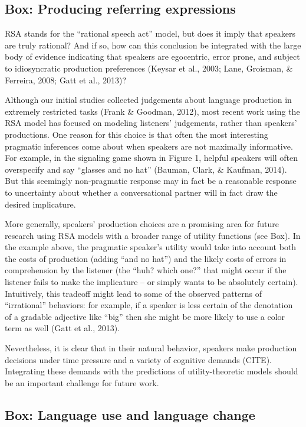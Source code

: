 \documentclass[]{elsarticle}
\begin{document}
\subsection{Box: Producing referring expressions
}\label{box-producing-referring-expressions}

RSA stands for the ``rational speech act'' model, but does it imply that
speakers are truly rational? And if so, how can this conclusion be
integrated with the large body of evidence indicating that speakers are
egocentric, error prone, and subject to idiosyncratic production
preferences (Keysar et al., 2003; Lane, Groisman, \& Ferreira, 2008;
Gatt et al., 2013)?

Although our initial studies collected judgements about language
production in extremely restricted tasks (Frank \& Goodman, 2012), most
recent work using the RSA model has focused on modeling listeners'
judgements, rather than speakers' productions. One reason for this
choice is that often the most interesting pragmatic inferences come
about when speakers are not maximally informative. For example, in the
signaling game shown in Figure 1, helpful speakers will often
overspecify and say ``glasses and no hat'' (Bauman, Clark, \& Kaufman,
2014). But this seemingly non-pragmatic response may in fact be a
reasonable response to uncertainty about whether a conversational
partner will in fact draw the desired implicature.

More generally, speakers' production choices are a promising area for
future research using RSA models with a broader range of utility
functions (see Box). In the example above, the pragmatic speaker's
utility would take into account both the costs of production (adding
``and no hat'') and the likely costs of errors in comprehension by the
listener (the ``huh? which one?'' that might occur if the listener fails
to make the implicature -- or simply wants to be absolutely certain).
Intuitively, this tradeoff might lead to some of the observed patterns
of ``irrational'' behaviors: for example, if a speaker is less certain
of the denotation of a gradable adjective like ``big'' then she might be
more likely to use a color term as well (Gatt et al., 2013).

Nevertheless, it is clear that in their natural behavior, speakers make
production decisions under time pressure and a variety of cognitive
demands (CITE). Integrating these demands with the predictions of
utility-theoretic models should be an important challenge for future
work.

\subsection{Box: Language use and language
change}\label{box-language-use-and-language-change}
\end{document}
